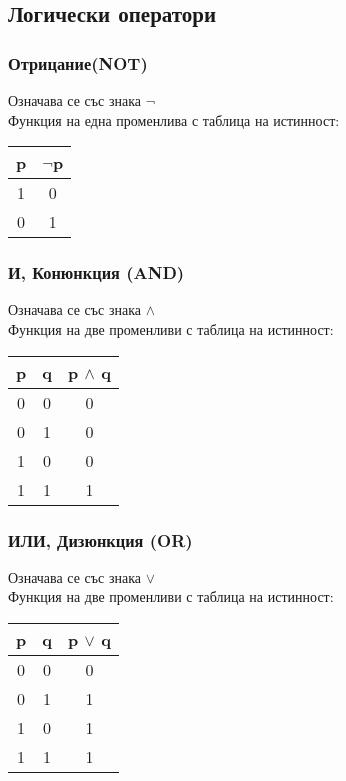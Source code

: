 \documentclass[fleqn, 12pt]{article}
\theoremstyle{definition}
\begin{document}
\subsection{Логически оператори}

\subsubsection{Отрицание(NOT)}
Означава се със знака $\neg$\\
Функция на една променлива с таблица на истинност: 
\begin{table}[htp]
  \begin{center}
    \begin{tabular}{|c|c|} 
\hline
      \textbf{p} & \textbf{$\neg$p} \\
      \hline
      1 & 0 \\
\hline
      0 & 1 \\
\hline
    \end{tabular}
  \end{center}
\end{table}

\subsubsection{И, Конюнкция (AND)}
Означава се със знака $\land$\\
Функция на две променливи с таблица на истинност: 
\begin{table}[htp]
  \begin{center}
    \begin{tabular}{|c|c|c|} 
\hline
      \textbf{p} & \textbf{q}  & \textbf{p $\land$ q} \\
      \hline
	0 & 0 & 0 \\
\hline
	0 & 1 & 0 \\
\hline
	1 & 0 & 0 \\
\hline
 	1 & 1 & 1 \\
\hline
    \end{tabular}
  \end{center}
\end{table}

\subsubsection{ИЛИ, Дизюнкция (OR)}
Означава се със знака $\lor$\\
Функция на две променливи с таблица на истинност: 
\begin{table}[htp]
  \begin{center}
    \begin{tabular}{|c|c|c|} 
\hline
      \textbf{p} & \textbf{q}  & \textbf{p $\lor$ q} \\
      \hline
	0 & 0 & 0 \\
\hline
	0 & 1 & 1 \\
\hline
	1 & 0 & 1 \\
\hline
 	1 & 1 & 1 \\
\hline
    \end{tabular}
  \end{center}
\end{table}
\end{document}
